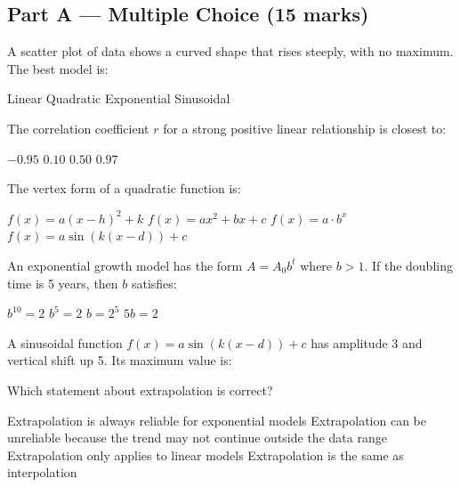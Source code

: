 \documentclass[addpoints]{exam}
\begin{document}
\newpage
\begin{questions}

\section*{Part A --- Multiple Choice (15 marks)}
\vspace{5mm}

\question[1]
A scatter plot of data shows a curved shape that rises steeply, with no maximum. The best model is:
\begin{choices}
    \choice Linear
    \choice Quadratic
    \correctchoice Exponential
    \choice Sinusoidal
\end{choices}
\vspace{3mm}

\question[1]
The correlation coefficient $r$ for a strong positive linear relationship is closest to:
\begin{choices}
    \choice $-0.95$
    \choice $0.10$
    \choice $0.50$
    \correctchoice $0.97$
\end{choices}
\vspace{3mm}

\question[1]
The vertex form of a quadratic function is:
\begin{choices}
    \correctchoice $f(x) = a(x-h)^2 + k$
    \choice $f(x) = ax^2 + bx + c$
    \choice $f(x) = a \cdot b^x$
    \choice $f(x) = a\sin(k(x-d)) + c$
\end{choices}
\vspace{3mm}

\question[1]
An exponential growth model has the form $A = A_0 b^t$ where $b > 1$. If the doubling time is 5 years, then $b$ satisfies:
\begin{choices}
    \choice $b^{10} = 2$
    \correctchoice $b^5 = 2$
    \choice $b = 2^5$
    \choice $5b = 2$
\end{choices}
\vspace{3mm}

\question[1]
A sinusoidal function $f(x) = a\sin(k(x-d)) + c$ has amplitude 3 and vertical shift up 5. Its maximum value is:
\begin{choices}
\end{choices}
\vspace{3mm}

\question[1]
Which statement about extrapolation is correct?
\begin{choices}
    \choice Extrapolation is always reliable for exponential models
    \correctchoice Extrapolation can be unreliable because the trend may not continue outside the data range
    \choice Extrapolation only applies to linear models
    \choice Extrapolation is the same as interpolation
\end{choices}
\vspace{3mm}


\end{questions}
\end{document}
